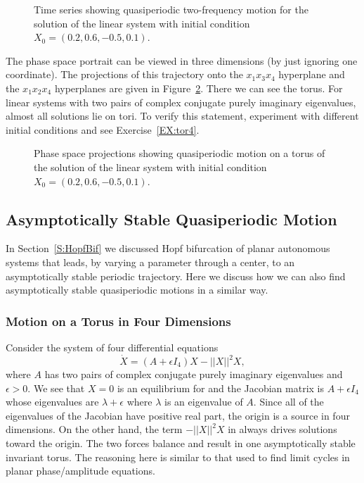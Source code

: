 \begin{figure}[htb]
   \centerline{%
   }
   \caption{Time series showing quasiperiodic two-frequency motion for the 
	solution of the linear system \protect{} with initial 
	condition $X_0=(0.2,0.6,-0.5,0.1)$.}
   \label{F:ftor4ts}
\end{figure}

The phase space portrait can be viewed in three dimensions (by just 
ignoring one coordinate).  The projections of this trajectory onto the 
$x_1x_3x_4$ hyperplane and the $x_1x_2x_4$ hyperplanes are given in 
Figure~\ref{F:ftorphase}.  There we can see the torus.  For 
linear systems with two pairs of complex conjugate purely imaginary
eigenvalues, almost all solutions lie on tori.  To verify this statement, 
experiment with different initial conditions and see Exercise~\ref{EX:tor4}. 

\begin{figure}[htb]
   \centerline{%
   }
   \caption{Phase space projections showing quasiperiodic motion on a torus of 
	the solution of the linear system \protect{} with initial 
	condition $X_0=(0.2,0.6,-0.5,0.1)$.}
   \label{F:ftorphase}
\end{figure}

\subsection*{Asymptotically Stable Quasiperiodic Motion}

In Section~\ref{S:HopfBif} we discussed Hopf bifurcation of planar autonomous 
systems that leads, by varying a parameter through a center, to an 
asymptotically stable periodic trajectory.  Here we discuss how we can also 
find asymptotically stable quasiperiodic motions 
in a similar way.  

\subsubsection*{Motion on a Torus in Four Dimensions}

Consider the system of four differential equations 
\begin{equation*}  \label{e:nonlintor}
\dot{X} = (A+\epsilon I_4)X - ||X||^2X,
\end{equation*}
where $A$ has two pairs of complex conjugate purely imaginary eigenvalues
and $\epsilon>0$.  We see that $X=0$ is an equilibrium for 
and the Jacobian 
matrix is $A+\epsilon I_4$ whose eigenvalues 
are $\lambda+\epsilon$ where $\lambda$ is an eigenvalue of $A$.  Since all 
of the eigenvalues of the Jacobian have positive real part, the origin is a 
source in four dimensions.  On the other hand, the term 
$-||X||^2X$ in  always drives solutions toward the origin. 
The two forces balance and result in one asymptotically stable invariant 
torus.   The reasoning here is similar to that used to find limit cycles in
planar phase/amplitude equations.

